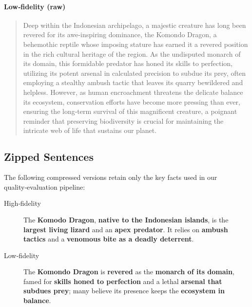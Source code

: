 \documentclass[11pt]{article}
\begin{document}
\paragraph{Low‑fidelity (raw)}
\begin{quote}
Deep within the Indonesian archipelago, a majestic creature has long been revered for its awe‑inspiring dominance, the Komondo Dragon, a behemothic reptile whose imposing stature has earned it a revered position in the rich cultural heritage of the region. As the undisputed monarch of its domain, this formidable predator has honed its skills to perfection, utilizing its potent arsenal in calculated precision to subdue its prey, often employing a stealthy ambush tactic that leaves its quarry bewildered and helpless. However, as human encroachment threatens the delicate balance its ecosystem, conservation efforts have become more pressing than ever, ensuring the long‑term survival of this magnificent creature, a poignant reminder that preserving biodiversity is crucial for maintaining the intricate web of life that sustains our planet.
\end{quote}


\subsection{Zipped Sentences}
The following compressed versions retain only the key facts used in our
quality‑evaluation pipeline:

\begin{description}
  \item[High‑fidelity] The \textbf{Komodo Dragon}, \textbf{native to the Indonesian islands}, is the \textbf{largest living lizard} and an \textbf{apex predator}. It relies on \textbf{ambush tactics} and a \textbf{venomous bite as a deadly deterrent}.
  \item[Low‑fidelity] The \textbf{Komondo Dragon} is \textbf{revered} as the \textbf{monarch of its domain}, famed for \textbf{skills honed to perfection} and a lethal \textbf{arsenal that subdues prey}; many believe its presence keeps the \textbf{ecosystem in balance}.
\end{description}

\end{document}
